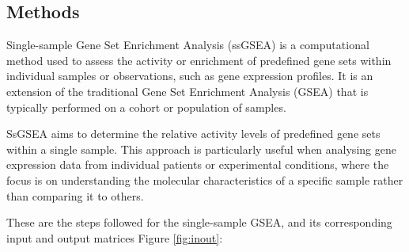\documentclass[aps,prb,twocolumn,superscriptaddress,floatfix,longbibliography]{revtex4-2}
\newif\ifptitle
\newif\ifpnumber
\newcounter{para}
\newcommand\ptitle[1]{\par\refstepcounter{para}
{\ifpnumber{\noindent\textcolor{lightgray}{\textbf{\thepara}}\indent}\fi}
{\ifptitle{\textbf{[{#1}]}}\fi}}
\begin{document}
\subsection{Methods}

\ptitle{Rank-based statistics} Single-sample Gene Set Enrichment Analysis (ssGSEA) is a computational method used to assess the activity or enrichment of predefined gene sets within individual samples or observations, such as gene expression profiles. It is an extension of the traditional Gene Set Enrichment Analysis (GSEA) that is typically performed on a cohort or population of samples.

SsGSEA aims to determine the relative activity levels of predefined gene sets within a single sample. This approach is particularly useful when analysing gene expression data from individual patients or experimental conditions, where the focus is on understanding the molecular characteristics of a specific sample rather than comparing it to others.

\vspace{2mm}

\label{sec:ks-statistic}
These are the steps followed for the single-sample GSEA, and its corresponding input and output matrices Figure \ref{fig:inout}:
\end{document}
